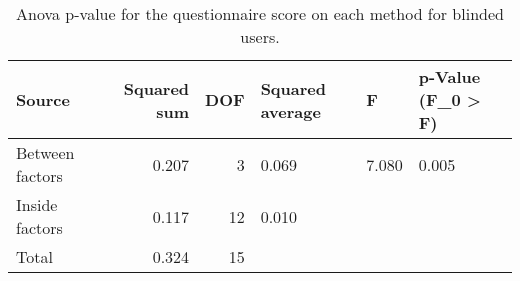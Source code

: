 
\begin{table}[!htb]
\centering
\caption{Anova p-value for the questionnaire score on each method for blinded users.}
\label{tab:anova_sagat}
\begin{tabular}{lrrlll}
\toprule
         Source &  Squared sum &  DOF & Squared average &     F & p-Value (F\_0 > F) \\
\midrule
Between factors &        0.207 &    3 &           0.069 & 7.080 &             0.005 \\
 Inside factors &        0.117 &   12 &           0.010 &       &                   \\
          Total &        0.324 &   15 &                 &       &                   \\
\bottomrule
\end{tabular}
\end{table}

